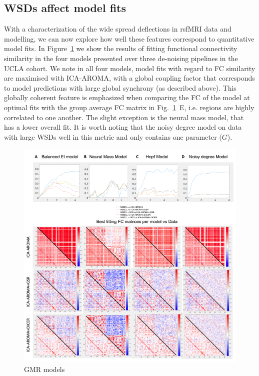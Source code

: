 \documentclass[oneside]{zHenriquesLab-StyleBioRxiv}
\begin{document}
\subsection*{WSDs affect model fits}
With a characterization of the wide spread deflections in rsfMRI data and modelling, we can now explore how well these features correspond to quantitative model fits. In Figure~\ref{fig:FC_fits} we show the results of fitting functional connectivity similarity in the four models presented over three de-noising pipelines in the UCLA cohort. We note in all four models, model fits with regard to FC similarity are maximised with ICA-AROMA, with a global coupling factor that corresponds to model predictions with large global synchrony (as described above). This globally coherent feature is emphasized when comparing the FC of the model at optimal fits with the group average FC matrix in Fig.~\ref{fig:FC_fits}~E, i.e. regions are highly correlated to one another. The slight exception is the neural mass model, that has a lower overall fit. It is worth noting that the noisy degree model on data with large WSDs well in this metric and only contains one parameter ($G$). 

\begin{figure}[ht!]
\includegraphics[width=1\textwidth]{figs/FC_comparisons_all.png}
\caption{GMR models}\label{fig:FC_fits}
\end{figure}
\end{document}
